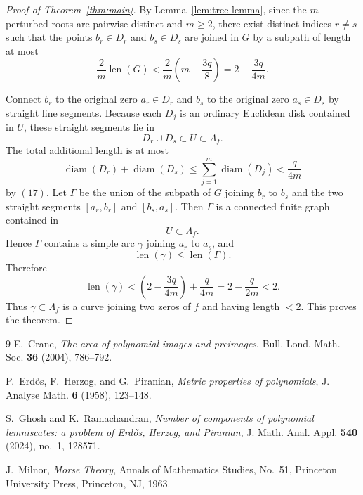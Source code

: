 \documentclass[12pt]{amsart}
\DeclareMathOperator{\len}{len}
\theoremstyle{definition}
\theoremstyle{remark}
\begin{document}
\begin{proof}[Proof of Theorem~\ref{thm:main}]
By Lemma~\ref{lem:tree-lemma}, since the $m$ perturbed roots are pairwise
distinct and $m\ge 2$, there exist distinct indices $r\neq s$ such that
the points \(b_r\in D_r\) and \(b_s\in D_s\) are joined in \(G\) by a subpath of
length at most
\[
\frac{2}{m}\len(G)
<
\frac{2}{m}\left(m-\frac{3q}{8}\right)
=
2-\frac{3q}{4m}.
\tag{18}
\]

Connect \(b_r\) to the original zero \(a_r\in D_r\) and \(b_s\) to the original zero \(a_s\in D_s\) by
straight line segments. Because each $D_j$ is an ordinary Euclidean disk contained in $U$,
these straight segments lie in
\[
D_r\cup D_s \subset U \subset \Lambda_f.
\]
The total additional length is at most
\[
\operatorname{diam}(D_r)+\operatorname{diam}(D_s)
\le
\sum_{j=1}^m \operatorname{diam}(D_j)
<
\frac{q}{4m}
\]
by \((17)\). Let \(\Gamma\) be the union of the subpath of \(G\) joining \(b_r\) to \(b_s\) and the two straight
segments \([a_r,b_r]\) and \([b_s,a_s]\). Then \(\Gamma\) is a connected finite graph contained in
\[
U\subset \Lambda_f.
\]
Hence \(\Gamma\) contains a simple arc \(\gamma\) joining \(a_r\) to \(a_s\), and
\[
\len(\gamma)\le \len(\Gamma).
\]
Therefore
\[
\len(\gamma)
<
\left(2-\frac{3q}{4m}\right)+\frac{q}{4m}
=
2-\frac{q}{2m}
<2.
\]
Thus \(\gamma\subset \Lambda_f\) is a curve joining two zeros of \(f\) and having length \(<2\).
This proves the theorem.
\end{proof}

\begin{thebibliography}{9}
E.~Crane, \emph{The area of polynomial images and preimages}, Bull. Lond. Math. Soc. \textbf{36} (2004),
786--792.

P.~Erd\H{o}s, F.~Herzog, and G.~Piranian, \emph{Metric properties of polynomials}, J. Analyse Math. \textbf{6}
(1958), 123--148.

S.~Ghosh and K.~Ramachandran, \emph{Number of components of polynomial lemniscates: a problem
of Erd\H{o}s, Herzog, and Piranian}, J. Math. Anal. Appl. \textbf{540} (2024), no.~1, 128571.

J.~Milnor, \emph{Morse Theory}, Annals of Mathematics Studies, No.~51, Princeton University Press,
Princeton, NJ, 1963.
\end{thebibliography}
\end{document}
